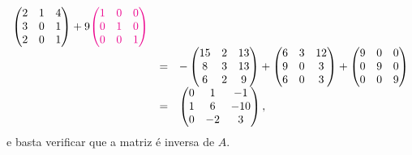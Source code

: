\documentclass[11pt,a4paper]{article}
\begin{document}
{{\[\begin{array}{rcl}
{\begin{pmatrix}
2 & 1 & 4 \\ 3 & 0 & 1 \\ 2 & 0 & 1
\end{pmatrix} } + 9 \textcolor{Magenta}{      \begin{pmatrix}
1 &0 & 0 \\ 0 & 1 & 0 \\ 0 & 0 & 1
\end{pmatrix} } \\
&=& - \begin{pmatrix}
15 & 2 & 13 \\ 8 & 3 & 13 \\ 6 & 2 & 9
\end{pmatrix} +    \begin{pmatrix}
6 & 3 & 12 \\ 9 & 0 & 3\\ 6 & 0 & 3
\end{pmatrix}  +   \begin{pmatrix}
9 &0 & 0 \\ 0 & 9 & 0 \\ 0 & 0 & 9
\end{pmatrix} \\
&=& \begin{pmatrix}
0 &1 & -1 \\ 1 & 6 & -10 \\ 0 & -2 &3 
\end{pmatrix},
\end{array}
\]
e basta verificar que a matriz é inversa de $A$.
}
}
\end{document}
